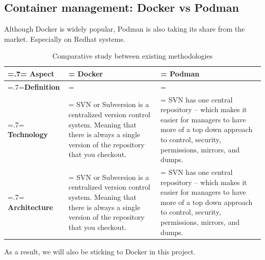 \subsection{Container management: Docker vs Podman}
Although Docker is widely popular, Podman is also taking its share from the market. Especially on Redhat systems.
\begin{table}[H]
	\renewcommand{\arraystretch}{1.5}%
	\caption{Comparative study between existing methodologies}
	\centering
	\medskip
	\begin{tabularx}{1\textwidth} {
			| >{\hsize=.7\hsize\linewidth=\hsize\centering\arraybackslash}X
			| >{\hsize=1.15\hsize\linewidth=\hsize\centering\arraybackslash}X
			| >{\hsize=1.15\hsize\linewidth=\hsize\centering\arraybackslash}X |}
		\hline
		\rowcolor{primary} \textbf {Aspect} & \textbf {Docker}                                                                                                                              & \textbf {Podman}                                                                                                                                               \\
		\hline
		\textbf {Definition}                & \multicolumn{2}{Muasdlti-column}                                                                                                                                                                                                                                                                               \\
		\hline
		\textbf {Technology}                & SVN or Subversion is a centralized version control system. Meaning that there is always a single version of the repository that you checkout. & SVN has one central repository – which makes it easier for managers to have more of a top down approach to control, security, permissions, mirrors, and dumps. \\
		\hline
		\textbf {Architecture}              & SVN or Subversion is a centralized version control system. Meaning that there is always a single version of the repository that you checkout. & SVN has one central repository – which makes it easier for managers to have more of a top down approach to control, security, permissions, mirrors, and dumps. \\
		\hline
	\end{tabularx}
\end{table}
As a result, we will also be sticking to Docker in this project.
